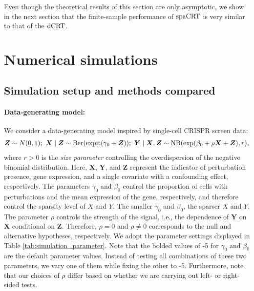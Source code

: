 \documentclass[12pt]{article}
\theoremstyle{definition}
\newcommand{\E}{\mathbb E}								%
\newcommand{\V}{\mathrm{Var}}							%
\newcommand{\expit}{\mathrm{expit}}                 	%
\newcommand{\prx}{\bm X}								%
\newcommand{\srx}{X}									%
\newcommand{\prz}{\bm Z}								%
\newcommand{\pry}{{\bm Y}}								%
\newcommand{\sry}{Y}									%
\newcommand{\dCRT}{\textnormal{dCRT}} 					%
\newcommand{\spacrt}{\textnormal{spaCRT}}               %
\begin{document}
Even though the theoretical results of this section are only asymptotic, we show in the next section that the finite-sample performance of $\spacrt$ is very similar to that of the $\dCRT$.

\section{Numerical simulations}\label{sec:simulation}


\subsection{Simulation setup and methods compared} \label{sec:simulation-setup}

\paragraph{Data-generating model:}
We consider a data-generating model inspired by single-cell CRISPR screen data:
\small
\begin{align}\label{eq:simulation-model}
  \bm Z\sim N(0,1); \	\bm X \mid \bm Z\sim \textnormal{Ber}(\expit(\gamma_0+\bm Z));\ \bm Y \mid \bm X,\bm Z\sim \textnormal{NB}(\exp(\beta_0+\rho\bm X+\bm Z),r),
\end{align}
\normalsize
where $r > 0$ is the \textit{size parameter} controlling the overdispersion of the negative binomial distribution. Here, $\prx$, $\pry$, and $\prz$ represent the indicator of perturbation presence, gene expression, and a single covariate with a confounding effect, respectively. The parameters $\gamma_0$ and $\beta_0$ control the proportion of cells with perturbations and the mean expression of the gene, respectively, and therefore control the sparsity level of $\srx$ and $\sry$. The smaller $\gamma_0$ and $\beta_0$, the sparser $\srx$ and $\sry$. The parameter $\rho$ controls the strength of the signal, i.e., the dependence of $\pry$ on $\prx$ conditional on $\prz$. Therefore, $\rho = 0$ and $\rho \neq 0$ corresponds to the null and alternative hypotheses, respectively. 
We adopt the parameter settings displayed in Table \ref{tab:simulation_parameter}. Note that the bolded values of -5 for $\gamma_0$ and $\beta_0$ are the default parameter values. Instead of testing all combinations of these two parameters, we vary one of them while fixing the other to -5. Furthermore, note that our choices of $\rho$ differ based on whether we are carrying out left- or right-sided tests.
\end{document}
